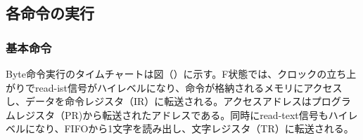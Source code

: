 \documentclass[paper]{ieicej}
\begin{document}




\subsection{各命令の実行}

\subsubsection{基本命令}

Byte命令実行のタイムチャートは図（）に示す。F状態では、クロックの立ち上がりでread-ist信号がハイレベルになり、命令が格納されるメモリにアクセスし、データを命令レジスタ（IR）に転送される。アクセスアドレスはプログラムレジスタ（PR)から転送されたアドレスである。同時にread-text信号もハイレベルになり、FIFOから1文字を読み出し、文字レジスタ（TR）に転送される。
\end{document}
